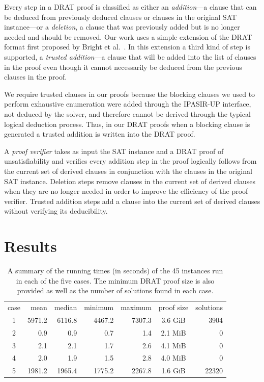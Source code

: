 \documentclass[runningheads]{llncs}
\begin{document}
Every step in a DRAT proof is classified as either an \emph{addition}---a clause that can be deduced
from previously deduced clauses or clauses in the original SAT instance---or
a \emph{deletion}, a clause that was previously added but is no longer needed and should be removed.
Our work uses a simple extension of the DRAT format first proposed by Bright et al.~\cite{Bright2020}.  In this
extension a third kind of step is supported, a \emph{trusted addition}---a
clause that will be added into the list of clauses in the proof
even though it cannot necessarily be deduced from the previous clauses in the proof.

We require trusted clauses in our proofs
because the blocking clauses we used to perform exhaustive enumeration
were added through the IPASIR-UP interface, not deduced by the solver, and therefore
cannot be derived through the typical logical deduction process.
Thus, in our DRAT proofs when a blocking clause is generated a trusted addition is written into the DRAT proof.

A \emph{proof verifier} takes as input the SAT instance
and a DRAT proof of unsatisfiability and verifies every addition step in the proof logically follows from
the current set of derived clauses in conjunction with the clauses in the original SAT instance.
Deletion steps remove clauses in the current set of derived clauses when they are no longer needed in order to improve the efficiency of the
proof verifier.  Trusted addition steps add a clause into the current set of derived clauses without
verifying its deducibility.

\section{Results}\label{sec:results}

\begin{table}[b]
\caption{A summary of the running times (in seconds) of the 45 instances run in each of the five cases.
The minimum DRAT proof size is also provided as well as the number of solutions found in each case.}
\centering
\begin{tabular}{c@{\quad}r@{\quad}r@{\quad}r@{\quad}r@{\quad}c@{\quad}r}
case &        mean &      median &     minimum &     maximum & proof size & solutions \\
   1 &      5971.2 &      6116.8 &      4467.2 &      7307.3 & 3.6 GiB & 3904\phantom{00} \\
   2 &         0.9 &         0.9 &         0.7 &         1.4 & 2.1 MiB & 0\phantom{00} \\
   3 &         2.1 &         2.1 &         1.7 &         2.6 & 4.1 MiB & 0\phantom{00} \\
   4 &         2.0 &         1.9 &         1.5 &         2.8 & 4.0 MiB & 0\phantom{00} \\
   5 &      1981.2 &      1965.4 &      1775.2 &      2267.8 & 1.6 GiB & 22320\phantom{00}
\end{tabular}
\label{tbl:results}
\end{table}
\end{document}
